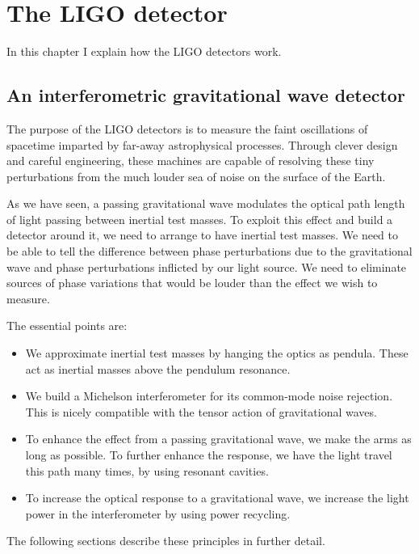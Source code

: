 \chapter{The LIGO detector}
\label{chapter2}

In this chapter I explain how the LIGO detectors work.

\section{An interferometric gravitational wave detector}

The purpose of the LIGO detectors is to measure the faint
oscillations of spacetime imparted by far-away astrophysical
processes.  Through clever design and careful engineering, these
machines are capable of resolving these tiny perturbations from the
much louder sea of noise on the surface of the Earth.

As we have seen, a passing gravitational wave modulates the optical
path length of light passing between inertial test
masses.  To exploit this effect and build a detector around it, we
need to arrange to have inertial test masses.  We need to be able to
tell the difference between phase perturbations due to the
gravitational wave and phase perturbations inflicted by our light
source.  We need to eliminate sources of phase variations that would
be louder than the effect we wish to measure.  

The essential points are:
\begin{itemize}
\item We approximate inertial test masses by hanging the optics as
  pendula.  These act as inertial masses above the pendulum resonance.
\item We build a Michelson interferometer for its common-mode noise
  rejection.  This is nicely compatible with the tensor action of
  gravitational waves.
\item To enhance the effect from a passing gravitational wave, we make
  the arms as long as possible.  To further enhance the response, we
  have the light travel this path many times, by using resonant cavities.
\item To increase the optical response to a gravitational wave, we
  increase the light power in the interferometer by using power
  recycling.
\end{itemize}
The following sections describe these principles in further detail.
